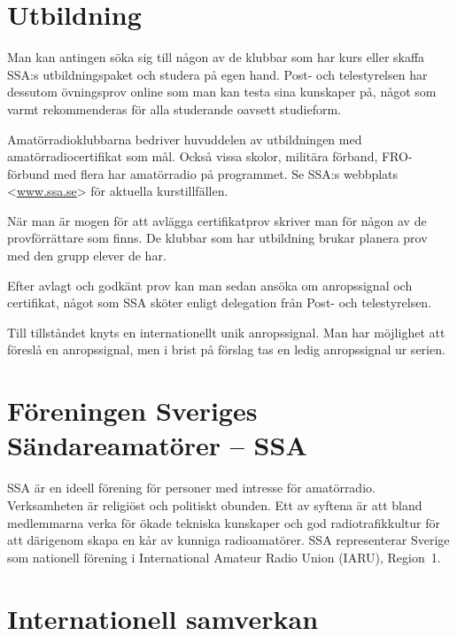 
\newpage
\section*{Utbildning}

Man kan antingen söka sig till någon av de klubbar som har kurs eller skaffa
SSA:s utbildningspaket och studera på egen hand.
Post- och telestyrelsen har dessutom övningsprov online som man kan testa sina
kunskaper på, något som varmt rekommenderas för alla studerande oavsett
studieform.

Amatörradioklubbarna bedriver huvuddelen av utbildningen med
amatör\-radio\-certi\-fikat som mål.
Också vissa skolor, militära förband, FRO-förbund med flera har amatörradio på
programmet.
Se SSA:s webbplats <\href{https://www.ssa.se}{www.ssa.se}> för aktuella kurstillfällen.

När man är mogen för att avlägga certifikatprov skriver man för någon av de
provförrättare som finns. De klubbar som har utbildning brukar planera prov
med den grupp elever de har.

Efter avlagt och godkänt prov kan man sedan ansöka om anropssignal och
certifikat, något som SSA sköter enligt delegation från Post- och telestyrelsen.

Till tillståndet knyts en internationellt unik anropssignal.
Man har möjlighet att föreslå en anropssignal, men i brist på förslag tas en ledig
anropssignal ur serien.

\section*{Föreningen Sveriges Sändareamatörer -- SSA}

SSA är en ideell förening för personer med intresse för amatörradio.
Verksamheten är religiöst och politiskt obunden.
Ett av syftena är att bland medlemmarna verka för ökade tekniska kunskaper och
god radiotrafikkultur för att därigenom skapa en kår av kunniga radioamatörer.
SSA representerar Sverige som nationell förening i
International Amateur Radio Union (IARU), Region~1.

\clearpage
\section*{Internationell samverkan}

